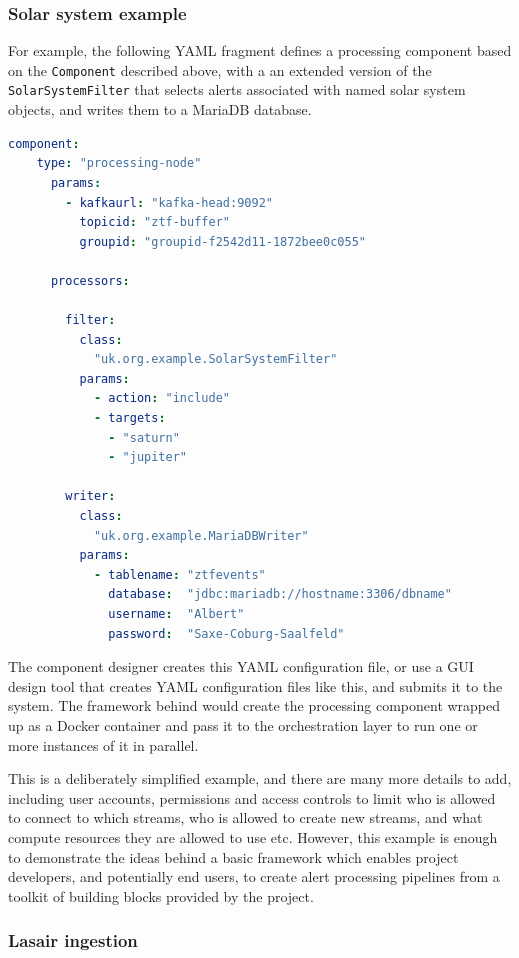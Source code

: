 \documentclass{article}
\newcommand{\yaml} {YAML\xspace}
\newcommand{\docker} {Docker\xspace}
\newcommand{\mariadb} {MariaDB\xspace}
\begin{document}
\subsubsection{Solar system example}
\label{workflow.solar-system}

For example, the following \yaml fragment defines a processing component based on the \texttt{Component} described above, with a an extended version of the \texttt{SolarSystemFilter} that selects alerts associated with named solar system objects, and writes them to a \mariadb database.

\begin{lstlisting}[language=yaml]
  component:
    type: "processing-node"
      params:
        - kafkaurl: "kafka-head:9092"
          topicid: "ztf-buffer"
          groupid: "groupid-f2542d11-1872bee0c055"

      processors:

        filter:
          class:
            "uk.org.example.SolarSystemFilter"
          params:
            - action: "include"
            - targets:
              - "saturn"
              - "jupiter"

        writer:
          class:
            "uk.org.example.MariaDBWriter"
          params:
            - tablename: "ztfevents"
              database:  "jdbc:mariadb://hostname:3306/dbname"
              username:  "Albert"
              password:  "Saxe-Coburg-Saalfeld"
\end{lstlisting}

The component designer creates this \yaml configuration file, or use a GUI design tool that creates \yaml configuration files like this, and submits it to the system.
The framework behind would create the processing component wrapped up as a \docker container and pass it to the orchestration layer to run one or more instances of it in parallel.

This is a deliberately simplified example, and there are many more details to add, including user accounts, permissions and access controls to limit who is allowed to connect to which streams, who is allowed to create new streams, and what compute resources they are allowed to use etc.
However, this example is enough to demonstrate the ideas behind a basic framework which enables project developers, and potentially end users, to create alert processing pipelines from a toolkit of building blocks provided by the project.

\subsubsection{Lasair ingestion}
\label{workflow.lasair-ingestion}
\end{document}
